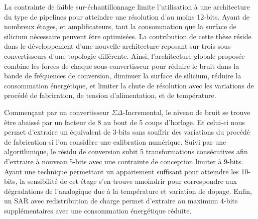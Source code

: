 \begin{mdframed}[linecolor=Prune,linewidth=1]
La contrainte de faible sur-échantillonnage limite l'utilisation à une architecture du type de pipelines pour atteindre une résolution d'au moins 12-bits. Ayant de nombreux étages, et amplificateurs, tant la consommation que la surface de silicium nécessaire peuvent être optimisées. La contribution de cette thèse réside dans le développement d'une nouvelle architecture reposant sur trois sous-convertisseurs d'une topologie différente. Ainsi, l'architecture globale proposée combine les forces de chaque sous-convertisseur pour réduire le bruit dans la bande de fréquences de conversion, diminuer la surface de silicium, réduire la consommation énergétique, et limiter la chute de résolution avec les variations de procédé de fabrication, de tension d'alimentation, et de température.

Commençant par un convertisseur $\Sigma\Delta$-Incremental, le niveau de bruit se trouve être abaissé par un facteur de 8 au bout de 5 coups d'horloge. Et celui-ci nous permet d'extraire un équivalent de 3-bits sans souffrir des variations du procédé de fabrication si l'on considère une calibration numérique. Suivi par une algorithmique, le résidu de conversion subit 5 transformations consécutives afin d'extraire à nouveau 5-bits avec une contrainte de conception limiter à 9-bits. Ayant une technique permettant un appariement suffisant pour atteindre les 10-bits, la sensibilité de cet étage s'en trouve amoindrir pour correspondre aux dégradations de l'analogique due à la température et variation de dopage. Enfin, un SAR avec redistribution de charge permet d'extraire au maximum 4-bits supplémentaires avec une consommation énergétique réduite.


\end{mdframed}
